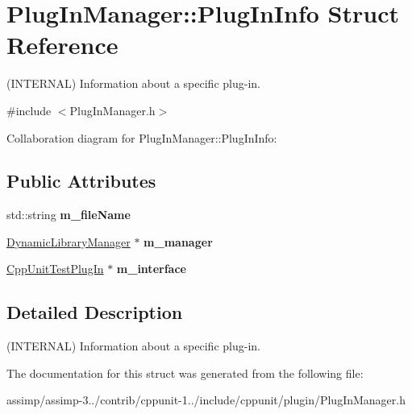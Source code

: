 \hypertarget{struct_plug_in_manager_1_1_plug_in_info}{\section{Plug\+In\+Manager\+:\+:Plug\+In\+Info Struct Reference}
\label{struct_plug_in_manager_1_1_plug_in_info}
}


(I\+N\+T\+E\+R\+N\+A\+L) Information about a specific plug-\/in.  




{\ttfamily \#include $<$Plug\+In\+Manager.\+h$>$}



Collaboration diagram for Plug\+In\+Manager\+:\+:Plug\+In\+Info\+:
\subsection*{Public Attributes}
\begin{DoxyCompactItemize}
\item 
\hypertarget{struct_plug_in_manager_1_1_plug_in_info_ac084e2efe4d9953812eff03966c06988}{std\+::string {\bfseries m\+\_\+file\+Name}}\label{struct_plug_in_manager_1_1_plug_in_info_ac084e2efe4d9953812eff03966c06988}

\item 
\hypertarget{struct_plug_in_manager_1_1_plug_in_info_a04a19dda0ea3f50b0cb05ea8c307f8cb}{\hyperlink{class_dynamic_library_manager}{Dynamic\+Library\+Manager} $\ast$ {\bfseries m\+\_\+manager}}\label{struct_plug_in_manager_1_1_plug_in_info_a04a19dda0ea3f50b0cb05ea8c307f8cb}

\item 
\hypertarget{struct_plug_in_manager_1_1_plug_in_info_a6fbf5847d0091f3dfb037743c9a8160a}{\hyperlink{struct_cpp_unit_test_plug_in}{Cpp\+Unit\+Test\+Plug\+In} $\ast$ {\bfseries m\+\_\+interface}}\label{struct_plug_in_manager_1_1_plug_in_info_a6fbf5847d0091f3dfb037743c9a8160a}

\end{DoxyCompactItemize}


\subsection{Detailed Description}
(I\+N\+T\+E\+R\+N\+A\+L) Information about a specific plug-\/in. 

The documentation for this struct was generated from the following file\+:\begin{DoxyCompactItemize}
\item 
assimp/assimp-\/3../contrib/cppunit-\/1../include/cppunit/plugin/Plug\+In\+Manager.\+h\end{DoxyCompactItemize}
